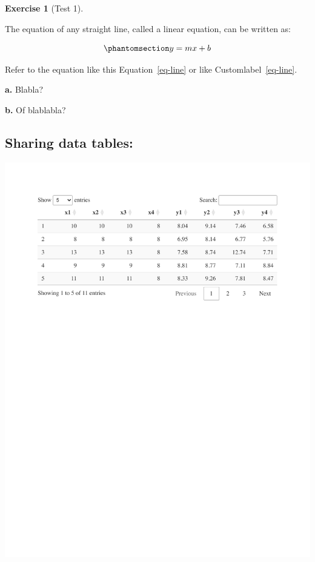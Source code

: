 \documentclass[
  letterpaper,
  DIV=11,
  numbers=noendperiod]{scrreprt}
\theoremstyle{definition}
\newtheorem{exercise}{Exercise}[chapter]
\theoremstyle{remark}
\begin{document}
\begin{exercise}[Test
1]\protect\hypertarget{exr-test1}{}\label{exr-test1}

The equation of any straight line, called a linear equation, can be
written as:

\begin{equation}\phantomsection\label{eq-line}{ 
y = mx + b
}\end{equation}

Refer to the equation like this Equation~\ref{eq-line} or like
Customlabel~\ref{eq-line}.

\textbf{a.} Blabla?

\textbf{b.} Of blablabla?

\end{exercise}

\subsection{Sharing data tables:}\label{sharing-data-tables}

\includegraphics{project_1_files/figure-pdf/tab-anscombe-1.pdf}
\end{document}
